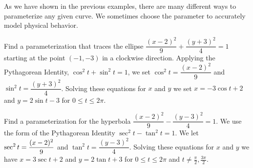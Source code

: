 As we have shown in the previous examples, there are many different ways to parameterize any given curve. We sometimes choose the parameter to accurately model physical behavior.

\begin{example}\label{ex_para_ellipse}%
Find a parameterization that traces the ellipse $\dfrac{(x-2)^2}{9}+\dfrac{(y+3)^2}{4}=1$ starting at the point $(-1,-3)$ in a clockwise direction.
\solution
Applying the Pythagorean Identity, $\cos^2t+\sin^2t=1$, we set $\cos^2 t=\dfrac{(x-2)^2}{9}$ and $\sin^2 t=\dfrac{(y+3)^2}{4}$. Solving these equations for $x$ and $y$ we set $x=-3\cos t+2$ and $y=2\sin t-3$  for $0\leq t\leq 2\pi$.
\end{example}

\begin{example}\label{ex_para_hyper}%
Find a parameterization for the hyperbola $\dfrac{(x-2)^2}{9}-\dfrac{(y-3)^2}{4}=1$.
\solution
We use the form of the Pythagorean Identity $\sec^2t-\tan^2t=1$. We let  $\displaystyle \sec^2 t=\frac{(x-2)^2}{9}$ and $\tan^2 t=\dfrac{(y-3)^2}{4}$. Solving these equations for $x$ and $y$ we have $x=3\sec t +2$ and $y=2\tan t +3$ for $0\leq t\leq 2\pi$ and $t\neq\frac\pi2,\frac{3\pi}2$.
\end{example}

